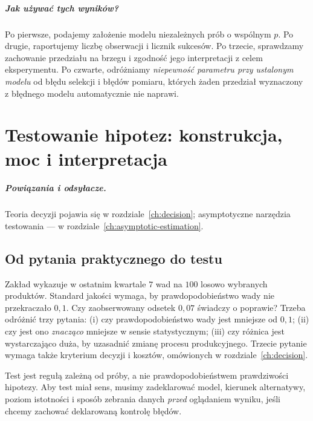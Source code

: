 \documentclass[11pt,a4paper,oneside]{report}
\numberwithin{equation}{chapter}
\theoremstyle{plain}
\theoremstyle{definition}
\theoremstyle{remark}
\begin{document}
\paragraph{Jak używać tych wyników?}
Po pierwsze, podajemy założenie modelu niezależnych prób o wspólnym
$p$. Po drugie, raportujemy liczbę obserwacji i licznik sukcesów.
Po trzecie, sprawdzamy zachowanie przedziału na brzegu i zgodność
jego interpretacji z celem eksperymentu. Po czwarte, odróżniamy
\emph{niepewność parametru przy ustalonym modelu} od błędu
selekcji i błędów pomiaru, których żaden przedział wyznaczony z
błędnego modelu automatycznie nie naprawi.

\chapter{Testowanie hipotez: konstrukcja, moc i interpretacja}
\label{ch:testing}
\paragraph{Powiązania i odsyłacze.} Teoria decyzji pojawia się w rozdziale~\ref{ch:decision}; asymptotyczne narzędzia testowania — w rozdziale~\ref{ch:asymptotic-estimation}.


\section{Od pytania praktycznego do testu}
Zakład wykazuje w ostatnim kwartale $7$ wad na $100$ losowo wybranych
produktów. Standard jakości wymaga, by prawdopodobieństwo wady nie
przekraczało $0{,}1$. Czy zaobserwowany odsetek $0{,}07$ świadczy o
poprawie? Trzeba odróżnić trzy pytania: (i) czy prawdopodobieństwo
wady jest mniejsze od $0{,}1$; (ii) czy jest ono \emph{znacząco}
mniejsze w sensie statystycznym; (iii) czy różnica jest wystarczająco
duża, by uzasadnić zmianę procesu produkcyjnego. Trzecie pytanie
wymaga także kryterium decyzji i kosztów, omówionych w rozdziale~\ref{ch:decision}.

Test jest regułą zależną od próby, a nie prawdopodobieństwem
prawdziwości hipotezy. Aby test miał sens, musimy zadeklarować
model, kierunek alternatywy, poziom istotności i sposób zebrania danych
\emph{przed} oglądaniem wyniku, jeśli chcemy zachować deklarowaną
kontrolę błędów.
\end{document}
